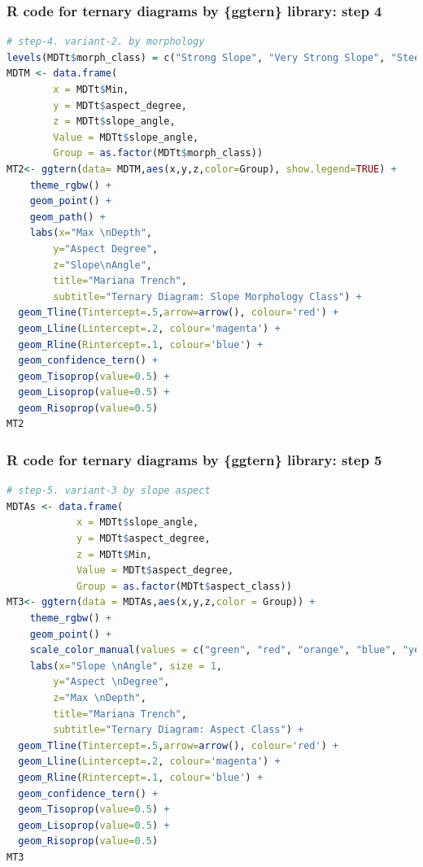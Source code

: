 \documentclass[pdflatex,compress,10pt,
	xcolor={dvipsnames,dvipsnames,svgnames,x11names,table},
	hyperref={colorlinks = true,breaklinks = true, urlcolor = NavyBlue, breaklinks = true}]{beamer}
\begin{document}
\begin{frame}[fragile]\frametitle{R code for ternary diagrams by \{ggtern\} library: step 4}
\begin{lstlisting}[language=R]
	# step-4. variant-2. by morphology
levels(MDTt$morph_class) = c("Strong Slope", "Very Strong Slope", "Steep Slope", "Extreme Slope")
MDTM <- data.frame(
		x = MDTt$Min,
		y = MDTt$aspect_degree,
		z = MDTt$slope_angle,
		Value = MDTt$slope_angle,
		Group = as.factor(MDTt$morph_class))
MT2<- ggtern(data= MDTM,aes(x,y,z,color=Group), show.legend=TRUE) + 
	theme_rgbw() +
	geom_point() + 
	geom_path() + 
	labs(x="Max \nDepth",
		y="Aspect Degree",
		z="Slope\nAngle",
  		title="Mariana Trench",
  		subtitle="Ternary Diagram: Slope Morphology Class") +
  geom_Tline(Tintercept=.5,arrow=arrow(), colour='red') +
  geom_Lline(Lintercept=.2, colour='magenta') +
  geom_Rline(Rintercept=.1, colour='blue') +
  geom_confidence_tern() +
  geom_Tisoprop(value=0.5) +
  geom_Lisoprop(value=0.5) +
  geom_Risoprop(value=0.5)
MT2
\end{lstlisting}
\end{frame}

\begin{frame}[fragile]\frametitle{R code for ternary diagrams by \{ggtern\} library: step 5}
\begin{lstlisting}[language=R]
	# step-5. variant-3 by slope aspect
MDTAs <- data.frame(
			x = MDTt$slope_angle,
			y = MDTt$aspect_degree,
			z = MDTt$Min,
			Value = MDTt$aspect_degree,
			Group = as.factor(MDTt$aspect_class))
MT3<- ggtern(data = MDTAs,aes(x,y,z,color = Group)) + 
	theme_rgbw() +
	geom_point() + 
	scale_color_manual(values = c("green", "red", "orange", "blue", "yellow" , "brown", "grey", "cyan")) + 
	labs(x="Slope \nAngle", size = 1, 
		y="Aspect \nDegree", 
		z="Max \nDepth",
  		title="Mariana Trench",
  		subtitle="Ternary Diagram: Aspect Class") +
  geom_Tline(Tintercept=.5,arrow=arrow(), colour='red') +
  geom_Lline(Lintercept=.2, colour='magenta') +
  geom_Rline(Rintercept=.1, colour='blue') +
  geom_confidence_tern() +
  geom_Tisoprop(value=0.5) +
  geom_Lisoprop(value=0.5) +
  geom_Risoprop(value=0.5) 
MT3
\end{lstlisting}
\end{frame}
\end{document}
